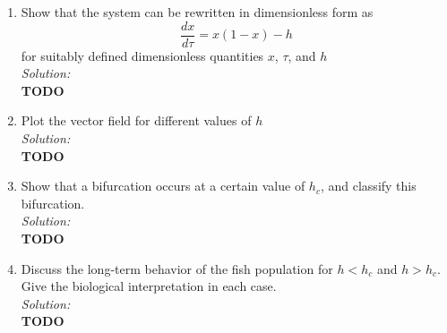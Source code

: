 \documentclass[10pt]{amsart}
\theoremstyle{nonumberplain}
\begin{document}
\begin{enumerate}[label={\bf {\arabic*}:}]
\begin{enumerate}

\item Show that the system can be rewritten in dimensionless form as 
$$
\frac {dx}{d\tau} = x(1 - x) - h
$$
for suitably defined dimensionless quantities $x$, $\tau$, and $h$ \\

\noindent
\textit{Solution:} \\
\textbf{TODO} \\

\item Plot the vector field for different values of $h$ \\

\noindent
\textit{Solution:} \\
\textbf{TODO} \\

\item Show that a bifurcation occurs at a certain value of $h_c$, and classify this bifurcation. \\

\noindent
\textit{Solution:} \\
\textbf{TODO} \\

\item Discuss the long-term behavior of the fish population for $h < h_c$ and $h > h_c$. 
Give the biological interpretation in each case. \\

\noindent
\textit{Solution:} \\
\textbf{TODO} \\

\end{enumerate}

\end{enumerate}
\end{document}
